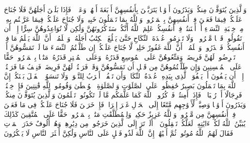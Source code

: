 \stopbuffer
\startbuffer[\q:2:234]
وَٱلَّذِینَ یُتَوَفَّوۡنَ مِنكُمۡ وَیَذَرُونَ أَزۡوَٰجࣰا یَتَرَبَّصۡنَ بِأَنفُسِهِنَّ أَرۡبَعَةَ أَشۡهُرࣲ وَعَشۡرࣰاۖ فَإِذَا بَلَغۡنَ أَجَلَهُنَّ فَلَا جُنَاحَ عَلَیۡكُمۡ فِیمَا فَعَلۡنَ فِیۤ أَنفُسِهِنَّ بِٱلۡمَعۡرُوفِۗ وَٱللَّهُ بِمَا تَعۡمَلُونَ خَبِیرࣱ%
\stopbuffer
\startbuffer[\q:2:235]
وَلَا جُنَاحَ عَلَیۡكُمۡ فِیمَا عَرَّضۡتُم بِهِۦ مِنۡ خِطۡبَةِ ٱلنِّسَاۤءِ أَوۡ أَكۡنَنتُمۡ فِیۤ أَنفُسِكُمۡۚ عَلِمَ ٱللَّهُ أَنَّكُمۡ سَتَذۡكُرُونَهُنَّ وَلَٰكِن لَّا تُوَاعِدُوهُنَّ سِرًّا إِلَّاۤ أَن تَقُولُوا۟ قَوۡلࣰا مَّعۡرُوفࣰاۚ وَلَا تَعۡزِمُوا۟ عُقۡدَةَ ٱلنِّكَاحِ حَتَّىٰ یَبۡلُغَ ٱلۡكِتَٰبُ أَجَلَهُۥۚ وَٱعۡلَمُوۤا۟ أَنَّ ٱللَّهَ یَعۡلَمُ مَا فِیۤ أَنفُسِكُمۡ فَٱحۡذَرُوهُۚ وَٱعۡلَمُوۤا۟ أَنَّ ٱللَّهَ غَفُورٌ حَلِیمࣱ%
\stopbuffer
\startbuffer[\q:2:236]
لَّا جُنَاحَ عَلَیۡكُمۡ إِن طَلَّقۡتُمُ ٱلنِّسَاۤءَ مَا لَمۡ تَمَسُّوهُنَّ أَوۡ تَفۡرِضُوا۟ لَهُنَّ فَرِیضَةࣰۚ وَمَتِّعُوهُنَّ عَلَى ٱلۡمُوسِعِ قَدَرُهُۥ وَعَلَى ٱلۡمُقۡتِرِ قَدَرُهُۥ مَتَٰعَۢا بِٱلۡمَعۡرُوفِۖ حَقًّا عَلَى ٱلۡمُحۡسِنِینَ%
\stopbuffer
\startbuffer[\q:2:237]
وَإِن طَلَّقۡتُمُوهُنَّ مِن قَبۡلِ أَن تَمَسُّوهُنَّ وَقَدۡ فَرَضۡتُمۡ لَهُنَّ فَرِیضَةࣰ فَنِصۡفُ مَا فَرَضۡتُمۡ إِلَّاۤ أَن یَعۡفُونَ أَوۡ یَعۡفُوَا۟ ٱلَّذِی بِیَدِهِۦ عُقۡدَةُ ٱلنِّكَاحِۚ وَأَن تَعۡفُوۤا۟ أَقۡرَبُ لِلتَّقۡوَىٰۚ وَلَا تَنسَوُا۟ ٱلۡفَضۡلَ بَیۡنَكُمۡۚ إِنَّ ٱللَّهَ بِمَا تَعۡمَلُونَ بَصِیرٌ%
\stopbuffer
\startbuffer[\q:2:238]
حَٰفِظُوا۟ عَلَى ٱلصَّلَوَٰتِ وَٱلصَّلَوٰةِ ٱلۡوُسۡطَىٰ وَقُومُوا۟ لِلَّهِ قَٰنِتِینَ%
\stopbuffer
\startbuffer[\q:2:239]
فَإِنۡ خِفۡتُمۡ فَرِجَالًا أَوۡ رُكۡبَانࣰاۖ فَإِذَاۤ أَمِنتُمۡ فَٱذۡكُرُوا۟ ٱللَّهَ كَمَا عَلَّمَكُم مَّا لَمۡ تَكُونُوا۟ تَعۡلَمُونَ%
\stopbuffer
\startbuffer[\q:2:240]
وَٱلَّذِینَ یُتَوَفَّوۡنَ مِنكُمۡ وَیَذَرُونَ أَزۡوَٰجࣰا وَصِیَّةࣰ لِّأَزۡوَٰجِهِم مَّتَٰعًا إِلَى ٱلۡحَوۡلِ غَیۡرَ إِخۡرَاجࣲۚ فَإِنۡ خَرَجۡنَ فَلَا جُنَاحَ عَلَیۡكُمۡ فِی مَا فَعَلۡنَ فِیۤ أَنفُسِهِنَّ مِن مَّعۡرُوفࣲۗ وَٱللَّهُ عَزِیزٌ حَكِیمࣱ%
\stopbuffer
\startbuffer[\q:2:241]
وَلِلۡمُطَلَّقَٰتِ مَتَٰعُۢ بِٱلۡمَعۡرُوفِۖ حَقًّا عَلَى ٱلۡمُتَّقِینَ%
\stopbuffer
\startbuffer[\q:2:242]
كَذَٰلِكَ یُبَیِّنُ ٱللَّهُ لَكُمۡ ءَایَٰتِهِۦ لَعَلَّكُمۡ تَعۡقِلُونَ%
\stopbuffer
\startbuffer[\q:2:243]
۞ أَلَمۡ تَرَ إِلَى ٱلَّذِینَ خَرَجُوا۟ مِن دِیَٰرِهِمۡ وَهُمۡ أُلُوفٌ حَذَرَ ٱلۡمَوۡتِ فَقَالَ لَهُمُ ٱللَّهُ مُوتُوا۟ ثُمَّ أَحۡیَٰهُمۡۚ إِنَّ ٱللَّهَ لَذُو فَضۡلٍ عَلَى ٱلنَّاسِ وَلَٰكِنَّ أَكۡثَرَ ٱلنَّاسِ لَا یَشۡكُرُونَ%
\stopbuffer

